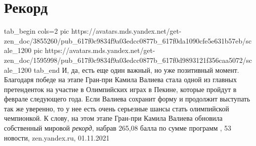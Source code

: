  
 
 
 
 
\chapter{Рекорд}

\ifcmt
  tab_begin cols=2
     pic https://avatars.mds.yandex.net/get-zen_doc/3855260/pub_617f0c9834f9a03edcc0877b_617f0da1090cfe5e631b57eb/scale_1200
     pic https://avatars.mds.yandex.net/get-zen_doc/1595998/pub_617f0c9834f9a03edcc0877b_617f0d9893121f356caa5072/scale_1200
  tab_end
\fi
И, да, есть еще один важный, но уже позитивный момент. Благодаря победе на
этапе Гран-при Камила Валиева стала одной из главных претенденток на участие в
Олимпийских играх в Пекине, которые пройдут в феврале следующего года. Если
Валиева сохранит форму и продолжит выступать так же уверенно, то у нее есть
очень серьезные шансы стать олимпийской чемпионкой.  К слову, на этом этапе
Гран-при Камила Валиева обновила собственный мировой \emph{рекорд}, набрав
265,08 балла по сумме программ
, 
53 новости, zen.yandex.ru, 01.11.2021
